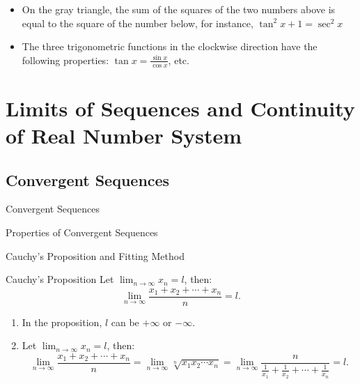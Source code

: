 \documentclass[11pt]{elegantbook}
\begin{document}
\begin{remark}
    \begin{itemize}
        \item On the gray triangle, the sum of the squares of the two numbers above is equal to the square of the number below,
            for instance, \(\tan^{2} x + 1 = \sec^{2}x\)
        \item The three trigonometric functions in the clockwise direction have the following properties: 
            $\tan x = \frac{\sin x}{\cos x}$, etc.
    \end{itemize}
\end{remark}



\chapter{Limits of Sequences and Continuity of Real Number System} 
\section{Convergent Sequences}
\begin{leftbarTitle}{Convergent Sequences}\end{leftbarTitle}

\begin{leftbarTitle}{Properties of Convergent Sequences}\end{leftbarTitle}



\begin{leftbarTitle}{Cauchy's Proposition and Fitting Method}\end{leftbarTitle}
\begin{proposition}{Cauchy's Proposition}
    Let \(\lim_{n \to \infty} x_n = l\), then:
    \[
        \lim_{n \to \infty} \frac{x_{1}+x_{2}+ \cdots +x_{n}}{n} = l.
    \]
\end{proposition}

\begin{note}
    \begin{enumerate}
        \item In the proposition, \(l\) can be \(+\infty\) or \(-\infty\).
        \item Let \(\lim_{n \to \infty} x_n = l\), then:
            \[
                \lim_{n \to \infty}\frac{x_{1}+x_{2}+ \cdots +x_{n}}{n}
                =\lim_{n \to \infty} \sqrt[n]{x_{1} x_{2} \cdots x_{n}} 
                =\lim_{n \to \infty} \frac{n}{\frac{1}{x_{1}} + \frac{1}{x_{2}} + \cdots + \frac{1}{x_{n}}}
                = l.
            \]
    \end{enumerate}
\end{note}
\end{document}
